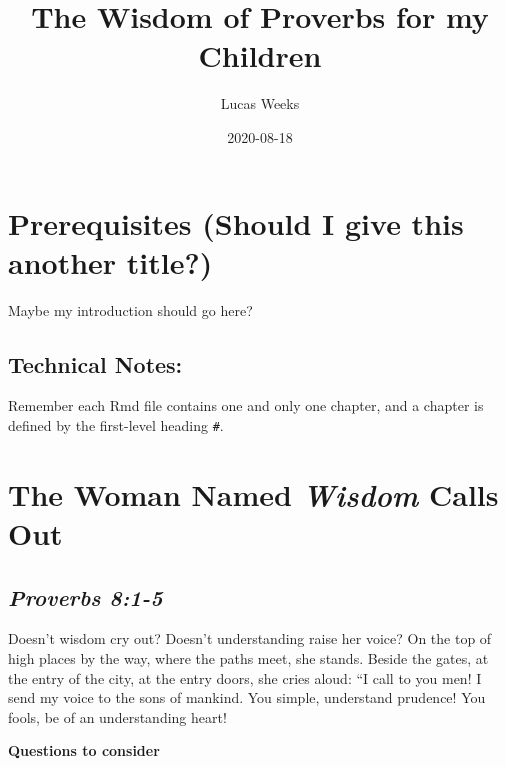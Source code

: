 \documentclass[
]{book}
\title{The Wisdom of Proverbs for my Children}
\author{Lucas Weeks}
\date{2020-08-18}
\begin{document}
\maketitle

{
\setcounter{tocdepth}{1}
\tableofcontents
}
\hypertarget{prerequisites-should-i-give-this-another-title}{%
\chapter{Prerequisites (Should I give this another title?)}\label{prerequisites-should-i-give-this-another-title}}

Maybe my introduction should go here?

\hypertarget{technical-notes}{%
\section{Technical Notes:}\label{technical-notes}}

Remember each Rmd file contains one and only one chapter, and a chapter is defined by the first-level heading \texttt{\#}.

\hypertarget{the-woman-named-wisdom-calls-out}{%
\chapter{\texorpdfstring{The Woman Named \emph{Wisdom} Calls Out}{The Woman Named Wisdom Calls Out}}\label{the-woman-named-wisdom-calls-out}}

\hypertarget{proverbs-81-5}{%
\section{\texorpdfstring{\emph{Proverbs 8:1-5}}{Proverbs 8:1-5}}\label{proverbs-81-5}}

Doesn't wisdom cry out?
Doesn't understanding raise her voice?
On the top of high places by the way,
where the paths meet, she stands.
Beside the gates, at the entry of the city,
at the entry doors, she cries aloud:
``I call to you men!
I send my voice to the sons of mankind.
You simple, understand prudence!
You fools, be of an understanding heart!

\textbf{Questions to consider}
\end{document}
